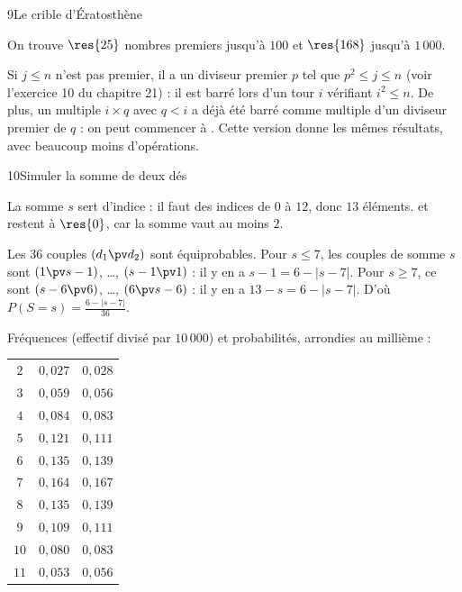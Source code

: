 \begin{corrige}{9}{Le crible d'Ératosthène}
\begin{questions}
\begin{codecote}[0.54]
On trouve $\res{25}$ nombres premiers jusqu'à $100$ et $\res{168}$ jusqu'à $1\,000$.
\end{codecote}
  \item Si $j\leq n$ n'est pas premier, il a un diviseur premier $p$ tel que $p^{2}\leq j\leq n$ (voir l'exercice 10 du
    chapitre 21) : il est barré lors d'un tour $i$ vérifiant $i^{2}\leq n$. De plus, un multiple $i\times q$ avec $q<i$ a déjà été barré
    comme multiple d'un diviseur premier de $q$ : on peut commencer à . Cette version donne les mêmes résultats, avec
    beaucoup moins d'opérations.
\end{questions}
\end{corrige}

\begin{corrige}{10}{Simuler la somme de deux dés}
\begin{questions}
  \item La somme $s$ sert d'indice : il faut des indices de $0$ à $12$, donc $13$ éléments.  et
     restent à $\res{0}$, car la somme vaut au moins $2$.
  \item Les $36$ couples $(d_1\pv d_2)$ sont équiprobables. Pour $s\leq7$, les couples de somme $s$ sont $(1\pv s-1)$, …,
    $(s-1\pv1)$ : il y en a $s-1=6-|s-7|$. Pour $s\geq7$, ce sont $(s-6\pv6)$, …, $(6\pv s-6)$ : il y en a $13-s=6-|s-7|$. D'où
    $P(S=s)=\frac{6-|s-7|}{36}$.
  \item Fréquences (effectif divisé par $10\,000$) et probabilités, arrondies au millième :
\begin{codecote}[0.5]
{\renewcommand{\arraystretch}{1.15}\small%
\begin{tabularx}{\linewidth}{@{}cYY@{}}
\toprule
{} &  &  \\
\midrule
$2$ & $0{,}027$ & $0{,}028$ \\
$3$ & $0{,}059$ & $0{,}056$ \\
$4$ & $0{,}084$ & $0{,}083$ \\
$5$ & $0{,}121$ & $0{,}111$ \\
$6$ & $0{,}135$ & $0{,}139$ \\
$7$ & $0{,}164$ & $0{,}167$ \\
$8$ & $0{,}135$ & $0{,}139$ \\
$9$ & $0{,}109$ & $0{,}111$ \\
$10$ & $0{,}080$ & $0{,}083$ \\
$11$ & $0{,}053$ & $0{,}056$ \\

\end{tabularx}}
\end{codecote}
\end{questions}
\end{corrige}
